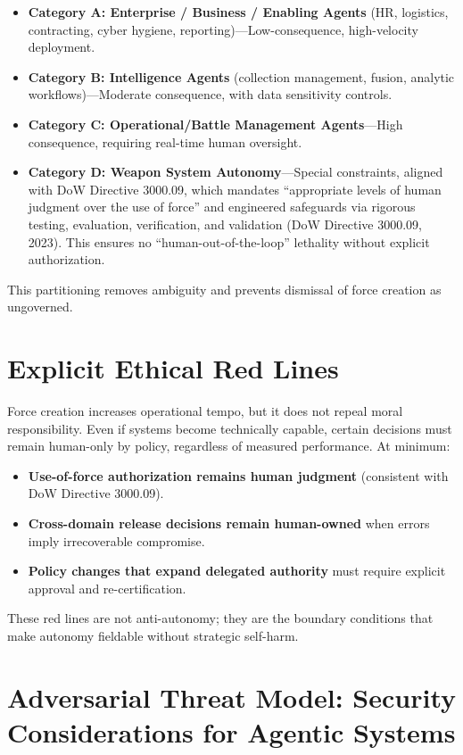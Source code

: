 \documentclass[11pt]{article}
\begin{document}
\begin{itemize}
\item
  \textbf{Category A: Enterprise / Business / Enabling Agents} (HR, logistics, contracting, cyber hygiene, reporting)---Low-consequence, high-velocity deployment.
\item
  \textbf{Category B: Intelligence Agents} (collection management, fusion, analytic workflows)---Moderate consequence, with data sensitivity controls.
\item
  \textbf{Category C: Operational/Battle Management Agents}---High consequence, requiring real-time human oversight.
\item
  \textbf{Category D: Weapon System Autonomy}---Special constraints, aligned with DoW Directive 3000.09, which mandates ``appropriate levels of human judgment over the use of force'' and engineered safeguards via rigorous testing, evaluation, verification, and validation (DoW Directive 3000.09, 2023). This ensures no ``human-out-of-the-loop'' lethality without explicit authorization.
\end{itemize}

This partitioning removes ambiguity and prevents dismissal of force creation as ungoverned.


\section{Explicit Ethical Red Lines}\label{ethical-red-lines}

Force creation increases operational tempo, but it does not repeal moral responsibility. Even if systems become technically capable, certain decisions must remain human-only by policy, regardless of measured performance. At minimum:
\begin{itemize}
\item \textbf{Use-of-force authorization remains human judgment} (consistent with DoW Directive 3000.09).
\item \textbf{Cross-domain release decisions remain human-owned} when errors imply irrecoverable compromise.
\item \textbf{Policy changes that expand delegated authority} must require explicit approval and re-certification.
\end{itemize}

These red lines are not anti-autonomy; they are the boundary conditions that make autonomy fieldable without strategic self-harm.


\section{Adversarial Threat Model: Security Considerations for Agentic Systems}\label{adversarial-threat-model-security-considerations-for-agentic-systems}
\end{document}
